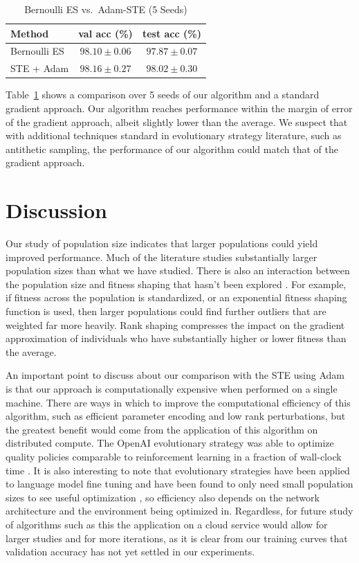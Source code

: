 \documentclass[runningheads]{llncs}
\begin{document}
\begin{table}[t]
\centering
\caption{Bernoulli ES vs.\ Adam-STE (5 Seeds)}
\label{tab:es-ste}
\begin{tabular}{lcc}
\toprule
Method & val acc (\%) & test acc (\%) \\
\midrule
Bernoulli ES & $98.10 \pm 0.06$ & $97.87 \pm 0.07$ \\
STE + Adam & $98.16 \pm 0.27$ & $98.02 \pm 0.30$ \\
\bottomrule
\end{tabular}
\end{table}

Table~\ref{tab:es-ste} shows a comparison over 5 seeds of our algorithm and a standard gradient approach. Our algorithm reaches performance within the margin of error of the gradient approach, albeit slightly lower than the average. We suspect that with additional techniques standard in evolutionary strategy literature, such as antithetic sampling, the performance of our algorithm could match that of the gradient approach.

\section{Discussion}
\label{sec:discussion}

Our study of population size indicates that larger populations could yield improved performance. Much of the literature studies substantially larger population sizes than what we have studied. There is also an interaction between the population size and fitness shaping that hasn't been explored \cite{wierstra2014natural,salimans2017evolution}. For example, if fitness across the population is standardized, or an exponential fitness shaping function is used, then larger populations could find further outliers that are weighted far more heavily. Rank shaping compresses the impact on the gradient approximation of individuals who have substantially higher or lower fitness than the average.

An important point to discuss about our comparison with the STE using Adam is that our approach is computationally expensive when performed on a single machine. There are ways in which to improve the computational efficiency of this algorithm, such as efficient parameter encoding and low rank perturbations, but the greatest benefit would come from the application of this algorithm on distributed compute. The OpenAI evolutionary strategy was able to optimize quality policies comparable to reinforcement learning in a fraction of wall-clock time \cite{salimans2017evolution}. It is also interesting to note that evolutionary strategies have been applied to language model fine tuning and have been found to only need small population sizes to see useful optimization \cite{sarkar2025eggroll}, so efficiency also depends on the network architecture and the environment being optimized in. Regardless, for future study of algorithms such as this the application on a cloud service would allow for larger studies and for more iterations, as it is clear from our training curves that validation accuracy has not yet settled in our experiments.
\end{document}
